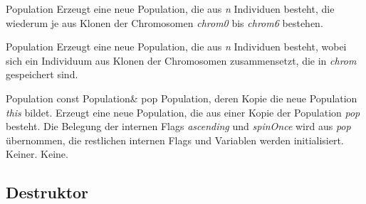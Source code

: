\documentclass{report}
\begin{document}
\setNormalInstance
\setCorrectWidthThree{8pt}
\printMethodWithParamsSaved
{}
{}
{Population}
{Erzeugt eine neue Population, die aus {\em n} Individuen
    besteht, die wiederum je aus Klonen der Chromosomen {\em chrom0} bis {\em chrom6}
    bestehen.}
{}
\setCorrectWidthThree{4pt}

\vspace{4ex}

\setNormalInstance
\setCorrectWidthThree{8pt}
\printMethodWithParamsSaved
{}
{}
{Population}
{Erzeugt eine neue Population, die aus {\em n} Individuen
    besteht, wobei sich ein Individuum aus Klonen der Chromosomen zusammensetzt, die in {\em chrom} gespeichert sind.}
{}
\setCorrectWidthThree{4pt}

\vspace{4ex}

\setNormalInstance
\printMethodWithOneParam
{}
{Population}
{const Population\&}
{pop}
{Population, deren Kopie die neue Population {\em this} bildet.}
{Erzeugt eine neue Population, die aus einer Kopie der
    Population {\em pop} besteht. Die Belegung der internen Flags
 {\em ascending} und {\em spinOnce} 
    wird aus {\em pop} \"ubernommen, die restlichen internen Flags
    und Variablen werden initialisiert.}
{Keiner.}
{Keine.}

\newpage

\subsection{Destruktor}
\end{document}
